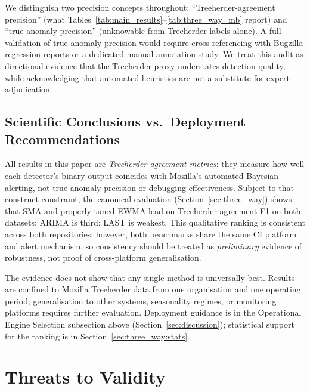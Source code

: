 \documentclass[a4paper,fleqn]{cas-sc}
\theoremstyle{plain}
\begin{document}
We distinguish two precision concepts throughout:
``Treeherder-agreement precision'' (what Tables~\ref{tab:main_results}--\ref{tab:three_way_mb} report)
and ``true anomaly precision'' (unknowable from Treeherder labels alone).
A full validation of true anomaly precision would require cross-referencing
with Bugzilla regression reports or a dedicated manual annotation study.
We treat this audit as directional evidence that the Treeherder proxy
understates detection quality, while acknowledging that automated
heuristics are not a substitute for expert adjudication.

\subsection{Scientific Conclusions vs.\ Deployment Recommendations}\label{sec:discussion:scientific}

All results in this paper are \emph{Treeherder-agreement metrics}: they
measure how well each detector's binary output coincides with Mozilla's
automated Bayesian alerting, not true anomaly precision or debugging
effectiveness.
Subject to that construct constraint, the canonical evaluation
(Section~\ref{sec:three_way}) shows that SMA and properly tuned EWMA lead
on Treeherder-agreement F1 on both datasets; ARIMA is third; LAST is weakest.
This qualitative ranking is consistent across both repositories; however,
both benchmarks share the same CI platform and alert mechanism, so
consistency should be treated as \emph{preliminary} evidence of robustness,
not proof of cross-platform generalisation.

The evidence does not show that any single method is universally best.
Results are confined to Mozilla Treeherder data from one organisation and
one operating period; generalisation to other systems, seasonality regimes,
or monitoring platforms requires further evaluation.
Deployment guidance is in the Operational Engine Selection subsection above
(Section~\ref{sec:discussion}); statistical support for the ranking is in
Section~\ref{sec:three_way:stats}.

\section{Threats to Validity}\label{sec:threats}
\end{document}
